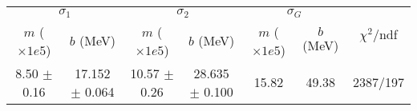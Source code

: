 \begin{tabular}{cc|cc|cc||c}
\multicolumn{2}{c|}{$\sigma_1$} & \multicolumn{2}{|c}{$\sigma_2$} & \multicolumn{2}{|c}{$\sigma_G$}  & \multirow{2}{*}{$\chi^2/$ndf}\\
$m$ ($\times1e5$) & $b$ (MeV) & $m$ ($\times1e5$) & $b$ (MeV) & $m$ ($\times1e5$) & $b$ (MeV) & \\
\hline
8.50 $\pm$ 0.16 & 17.152 $\pm$ 0.064 & 10.57 $\pm$ 0.26 & 28.635 $\pm$ 0.100 & 15.82 & 49.38 & 2387/197\\
\end{tabular}
